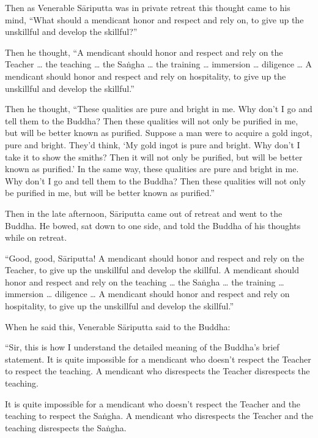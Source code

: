 \documentclass[12pt,openany]{book}%
\begin{document}
Then as Venerable \textsanskrit{Sāriputta} was in private retreat this thought came to his mind, “What should a mendicant honor and respect and rely on, to give up the unskillful and develop the skillful?” 

Then he thought, “A mendicant should honor and respect and rely on the Teacher … the teaching … the \textsanskrit{Saṅgha} … the training … immersion … diligence … A mendicant should honor and respect and rely on hospitality, to give up the unskillful and develop the skillful.” 

Then he thought, “These qualities are pure and bright in me. Why don’t I go and tell them to the Buddha? Then these qualities will not only be purified in me, but will be better known as purified. Suppose a man were to acquire a gold ingot, pure and bright. They’d think, ‘My gold ingot is pure and bright. Why don’t I take it to show the smiths? Then it will not only be purified, but will be better known as purified.’ In the same way, these qualities are pure and bright in me. Why don’t I go and tell them to the Buddha? Then these qualities will not only be purified in me, but will be better known as purified.” 

Then in the late afternoon, \textsanskrit{Sāriputta} came out of retreat and went to the Buddha. He bowed, sat down to one side, and told the Buddha of his thoughts while on retreat. 

“Good, good, \textsanskrit{Sāriputta}! A mendicant should honor and respect and rely on the Teacher, to give up the unskillful and develop the skillful. A mendicant should honor and respect and rely on the teaching … the \textsanskrit{Saṅgha} … the training … immersion … diligence … A mendicant should honor and respect and rely on hospitality, to give up the unskillful and develop the skillful.” 

When he said this, Venerable \textsanskrit{Sāriputta} said to the Buddha: 

“Sir, this is how I understand the detailed meaning of the Buddha’s brief statement. It is quite impossible for a mendicant who doesn’t respect the Teacher to respect the teaching. A mendicant who disrespects the Teacher disrespects the teaching. 

It is quite impossible for a mendicant who doesn’t respect the Teacher and the teaching to respect the \textsanskrit{Saṅgha}. A mendicant who disrespects the Teacher and the teaching disrespects the \textsanskrit{Saṅgha}. 
\end{document}
